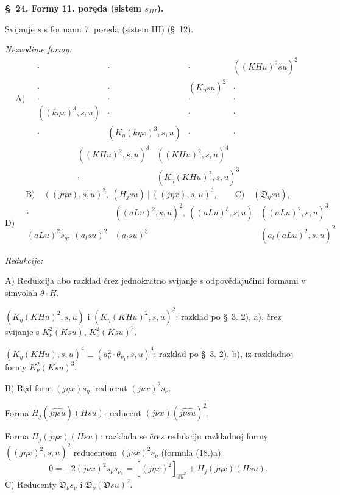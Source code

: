\documentclass[11pt]{article}
\newcommand{\D}{\mathfrak D}
\begin{document}
\begin{center}
\textbf{\S\ 24. \quad Formy 11. poręda (sistem $s_{III}$).}
\end{center}

Svijanje $s$ s formami 7. poręda (sistem III) (\S\ 12).

\noindent\textit{Nezvodime formy:}
\[
\text{A)}\quad
\begin{array}{c|c|c|c}
\cdot&\cdot&\cdot&((KHu)^2su)^2\\[0.35em]
\cdot&\cdot&(K_\eta su)^2&\cdot\\[0.35em]
\cdot&\cdot&\cdot&\cdot\\[0.35em]
((k\eta x)^3,s,u)&\cdot&\cdot&\cdot\\[0.35em]
\cdot&(K_\eta(k\eta x)^3,s,u)&\cdot&\cdot
\end{array}
\]
\[
\begin{array}{c|c}
((KHu)^2,s,u)^3&((KHu)^2,s,u)^4\\[0.45em]
\cdot&(K_\eta(KHu)^2,s,u)^3
\end{array}
\]
\[
\text{B)}\quad ((j\eta x),s,u)^2,\ (H_jsu)\ \big|\ ((j\eta x),s,u)^3,
\qquad \text{C)}\quad (\D_\eta su),
\]
\[
\text{D)}\quad
\begin{array}{c|c|c}
\cdot&((aLu)^2,s,u)^2,\ ((aLu)^3,s,u)&((aLu)^2,s,u)^3\\[0.5em]
(aLu)^2s_\eta,\ (a_lsu)^2&(a_lsu)^3&(a_l(aLu)^2,s,u)^2
\end{array}
\]

\noindent\textit{Redukcije:}

A) Redukcija abo razklad črez jednokratno svijanje s odpovědajučimi formami v simvolah $\theta\cdot H$.

$(K_\eta(KHu)^2,s,u)$ i $(K_\eta(KHu)^2,s,u)^2$: razklad po \S\ 3. 2), a), črez svijanje s $K_{\nu}^2(Ksu)$, $K_{\nu}^2(Ksu)^2$.

$(K_\eta(KHu),s,u)^4\equiv(a_{\nu}^2\cdot\theta_{\nu_1},s,u)^4$: razklad po \S\ 3. 2), b), iz razkladnoj formy $K_{\nu}^2(Ksu)^3$.

B) Ręd form $(j\eta x)s_\eta$: reducent $(j\nu x)^2s_{\nu}$.

Forma $H_j(\widehat{j\eta su})(Hsu)$: reducent $(j\nu x)(\widehat{j\nu su})^2$.

Forma $H_j(j\eta x)(Hsu)$: razklada se črez redukciju razkladnoj formy $((j\eta x)^2,s,u)^2$ reducentom $(j\nu x)^2s_{\nu}$ (formula (18.)a):
\[
0=-2(j\nu x)^2s_{\nu}s_{\nu_1}=[(j\eta x)^2]_{\widehat{su}^2}+H_j(j\eta x)(Hsu).
\]
C) Reducenty $\D_{\nu}s_{\nu}$ i $\D_{\nu}(\D su)^2$.
\end{document}

